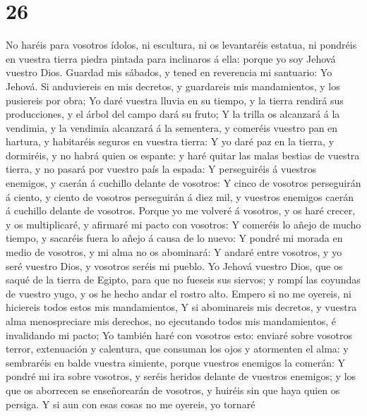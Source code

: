 \hypertarget{section-25}{%
\section{26}\label{section-25}}

 No haréis para vosotros ídolos, ni escultura, ni os
levantaréis estatua, ni pondréis en vuestra tierra piedra pintada para
inclinaros á ella: porque yo soy Jehová vuestro Dios. 
Guardad mis sábados, y tened en reverencia mi santuario: Yo Jehová.
 Si anduviereis en mis decretos, y guardareis mis
mandamientos, y los pusiereis por obra;  Yo daré vuestra
lluvia en su tiempo, y la tierra rendirá sus producciones, y el árbol
del campo dará su fruto;  Y la trilla os alcanzará á la
vendimia, y la vendimia alcanzará á la sementera, y comeréis vuestro pan
en hartura, y habitaréis seguros en vuestra tierra:  Y yo
daré paz en la tierra, y dormiréis, y no habrá quien os espante: y haré
quitar las malas bestias de vuestra tierra, y no pasará por vuestro país
la espada:  Y perseguiréis á vuestros enemigos, y caerán á
cuchillo delante de vosotros:  Y cinco de vosotros
perseguirán á ciento, y ciento de vosotros perseguirán á diez mil, y
vuestros enemigos caerán á cuchillo delante de vosotros. 
Porque yo me volveré á vosotros, y os haré crecer, y os multiplicaré, y
afirmaré mi pacto con vosotros:  Y comeréis lo añejo de
mucho tiempo, y sacaréis fuera lo añejo á causa de lo nuevo:
 Y pondré mi morada en medio de vosotros, y mi alma no os
abominará:  Y andaré entre vosotros, y yo seré vuestro
Dios, y vosotros seréis mi pueblo.  Yo Jehová vuestro Dios,
que os saqué de la tierra de Egipto, para que no fueseis sus siervos; y
rompí las coyundas de vuestro yugo, y os he hecho andar el rostro alto.
 Empero si no me oyereis, ni hiciereis todos estos mis
mandamientos,  Y si abominareis mis decretos, y vuestra
alma menospreciare mis derechos, no ejecutando todos mis mandamientos, é
invalidando mi pacto;  Yo también haré con vosotros esto:
enviaré sobre vosotros terror, extenuación y calentura, que consuman los
ojos y atormenten el alma: y sembraréis en balde vuestra simiente,
porque vuestros enemigos la comerán:  Y pondré mi ira sobre
vosotros, y seréis heridos delante de vuestros enemigos; y los que os
aborrecen se enseñorearán de vosotros, y huiréis sin que haya quien os
persiga.  Y si aun con esas cosas no me oyereis, yo tornaré

